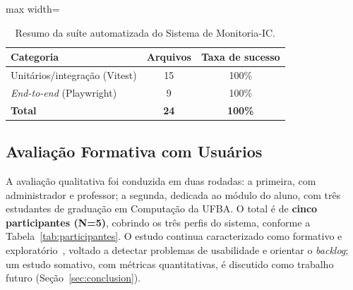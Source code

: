 \documentclass[portuguese]{sbc2025}%
\begin{document}
\begin{table}[!htbp]
  \centering
  \small
  \caption{Resumo da suíte automatizada do Sistema de Monitoria-IC.}
  \label{tab:resultados-tecnicos}
  \begin{adjustbox}{max width=\columnwidth}
    \begin{tabular}{|l|c|c|}
      \hline
      \textbf{Categoria} & \textbf{Arquivos} & \textbf{Taxa de sucesso} \\
      \hline
      Unitários/integração (Vitest) & 15 & 100\% \\ \hline
      \textit{End-to-end} (Playwright) & 9 & 100\% \\ \hline
      \textbf{Total} & \textbf{24} & \textbf{100\%} \\ \hline
    \end{tabular}
  \end{adjustbox}
\end{table}

\subsection{Avaliação Formativa com Usuários}
\label{sec:avaliacao-formativa}

A avaliação qualitativa foi conduzida em duas rodadas: a primeira, com administrador e professor; a segunda, dedicada ao módulo do aluno, com três estudantes de graduação em Computação da UFBA. O total é de \textbf{cinco participantes (N=5)}, cobrindo os três perfis do sistema, conforme a Tabela~\ref{tab:participantes}. O estudo continua caracterizado como formativo e exploratório~\cite{nielsen1994usability, lazar2017research}, voltado a detectar problemas de usabilidade e orientar o \textit{backlog}; um estudo somativo, com métricas quantitativas, é discutido como trabalho futuro (Seção~\ref{sec:conclusion}).
\end{document}
